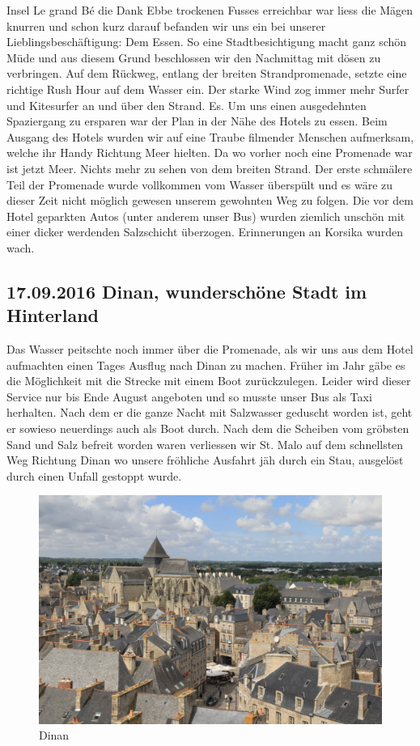 Insel \glqq Le grand Bé\grqq{} die Dank Ebbe trockenen Fusses erreichbar war liess die Mägen knurren und schon kurz darauf befanden wir uns ein bei unserer Lieblingsbeschäftigung: Dem Essen.
So eine Stadtbesichtigung macht ganz schön Müde und aus diesem Grund beschlossen wir den Nachmittag mit dösen zu verbringen.
Auf dem Rückweg, entlang der breiten Strandpromenade, setzte eine richtige Rush Hour auf dem Wasser ein.
Der starke Wind zog immer mehr Surfer und Kitesurfer an und über den Strand.
Es. Um uns einen ausgedehnten Spaziergang zu ersparen war der Plan in der Nähe des Hotels zu essen.
Beim Ausgang des Hotels wurden wir auf eine Traube filmender Menschen aufmerksam, welche ihr Handy Richtung Meer hielten.
Da wo vorher noch eine Promenade war ist jetzt Meer.
Nichts mehr zu sehen von dem breiten Strand.
Der erste schmälere Teil der Promenade wurde vollkommen vom Wasser überspült und es wäre zu dieser Zeit nicht möglich gewesen unserem gewohnten Weg zu folgen.
Die vor dem Hotel geparkten Autos (unter anderem unser Bus) wurden ziemlich unschön mit einer dicker werdenden Salzschicht überzogen.
Erinnerungen an Korsika wurden wach.

\subsection{17.09.2016 Dinan, wunderschöne Stadt im Hinterland}
Das Wasser peitschte noch immer über die Promenade, als wir uns aus dem Hotel aufmachten einen Tages Ausflug nach Dinan zu machen.
Früher im Jahr gäbe es die Möglichkeit mit die Strecke mit einem Boot zurückzulegen.
Leider wird dieser Service nur bis Ende August angeboten und so musste unser Bus als Taxi herhalten.
Nach dem er die ganze Nacht mit Salzwasser geduscht worden ist, geht er sowieso neuerdings auch als Boot durch.
Nach dem die Scheiben vom gröbsten Sand und Salz befreit worden waren verliessen wir St. Malo auf dem schnellsten Weg Richtung Dinan wo unsere fröhliche Ausfahrt jäh durch ein Stau, ausgelöst durch einen Unfall gestoppt wurde.

\begin{figure}[H]
    \centering
    \includegraphics[width=\textwidth]{../Bilder/Bretagne/161.jpg}
    \caption{Dinan}
    \label{img:Dinan}
\end{figure}

